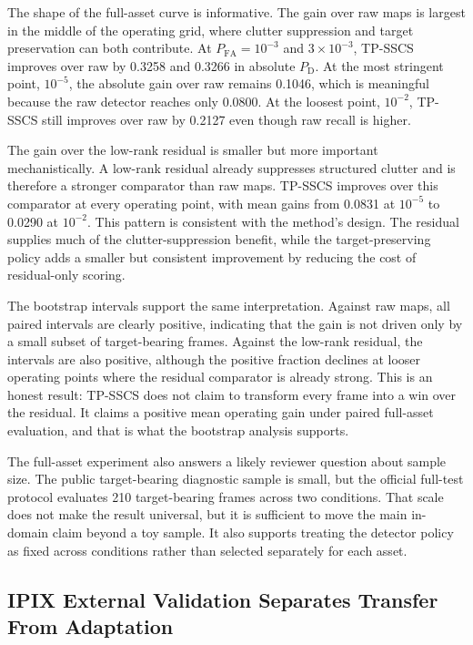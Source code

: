 \documentclass[journal]{IEEEtran}
\begin{document}
The shape of the full-asset curve is informative. The gain over raw maps is largest in the middle of the operating grid, where clutter suppression and target preservation can both contribute. At $P_{\mathrm{FA}}=10^{-3}$ and $3\times10^{-3}$, TP-SSCS improves over raw by 0.3258 and 0.3266 in absolute $P_{\mathrm{D}}$. At the most stringent point, $10^{-5}$, the absolute gain over raw remains 0.1046, which is meaningful because the raw detector reaches only 0.0800. At the loosest point, $10^{-2}$, TP-SSCS still improves over raw by 0.2127 even though raw recall is higher.

The gain over the low-rank residual is smaller but more important mechanistically. A low-rank residual already suppresses structured clutter and is therefore a stronger comparator than raw maps. TP-SSCS improves over this comparator at every operating point, with mean gains from 0.0831 at $10^{-5}$ to 0.0290 at $10^{-2}$. This pattern is consistent with the method's design. The residual supplies much of the clutter-suppression benefit, while the target-preserving policy adds a smaller but consistent improvement by reducing the cost of residual-only scoring.

The bootstrap intervals support the same interpretation. Against raw maps, all paired intervals are clearly positive, indicating that the gain is not driven only by a small subset of target-bearing frames. Against the low-rank residual, the intervals are also positive, although the positive fraction declines at looser operating points where the residual comparator is already strong. This is an honest result: TP-SSCS does not claim to transform every frame into a win over the residual. It claims a positive mean operating gain under paired full-asset evaluation, and that is what the bootstrap analysis supports.

The full-asset experiment also answers a likely reviewer question about sample size. The public target-bearing diagnostic sample is small, but the official full-test protocol evaluates 210 target-bearing frames across two conditions. That scale does not make the result universal, but it is sufficient to move the main in-domain claim beyond a toy sample. It also supports treating the detector policy as fixed across conditions rather than selected separately for each asset.

\subsection{IPIX External Validation Separates Transfer From Adaptation}
\end{document}

